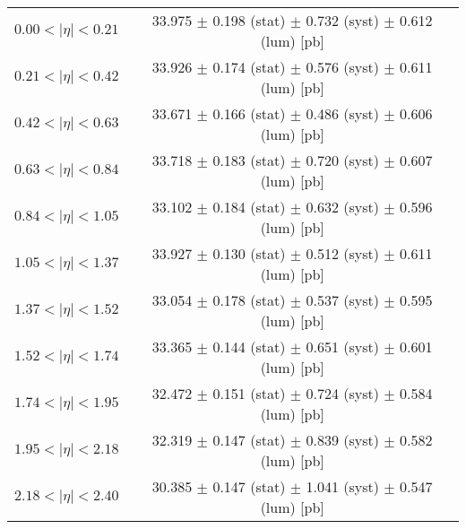 \begin{tabular}{lc}
\hline
$0.00 < |\eta| <0.21$          & 33.975 $\pm$ 0.198 (stat) $\pm$ 0.732 (syst) $\pm$ 0.612 (lum) [pb]  \\
$0.21 < |\eta| <0.42$          & 33.926 $\pm$ 0.174 (stat) $\pm$ 0.576 (syst) $\pm$ 0.611 (lum) [pb]  \\
$0.42 < |\eta| <0.63$          & 33.671 $\pm$ 0.166 (stat) $\pm$ 0.486 (syst) $\pm$ 0.606 (lum) [pb]  \\
$0.63 < |\eta| <0.84$          & 33.718 $\pm$ 0.183 (stat) $\pm$ 0.720 (syst) $\pm$ 0.607 (lum) [pb]  \\
$0.84 < |\eta| <1.05$          & 33.102 $\pm$ 0.184 (stat) $\pm$ 0.632 (syst) $\pm$ 0.596 (lum) [pb]  \\
$1.05 < |\eta| <1.37$          & 33.927 $\pm$ 0.130 (stat) $\pm$ 0.512 (syst) $\pm$ 0.611 (lum) [pb]  \\
$1.37 < |\eta| <1.52$          & 33.054 $\pm$ 0.178 (stat) $\pm$ 0.537 (syst) $\pm$ 0.595 (lum) [pb]  \\
$1.52 < |\eta| <1.74$          & 33.365 $\pm$ 0.144 (stat) $\pm$ 0.651 (syst) $\pm$ 0.601 (lum) [pb]  \\
$1.74 < |\eta| <1.95$          & 32.472 $\pm$ 0.151 (stat) $\pm$ 0.724 (syst) $\pm$ 0.584 (lum) [pb]  \\
$1.95 < |\eta| <2.18$          & 32.319 $\pm$ 0.147 (stat) $\pm$ 0.839 (syst) $\pm$ 0.582 (lum) [pb]  \\
$2.18 < |\eta| <2.40$          & 30.385 $\pm$ 0.147 (stat) $\pm$ 1.041 (syst) $\pm$ 0.547 (lum) [pb]  \\
\hline
\end{tabular}
